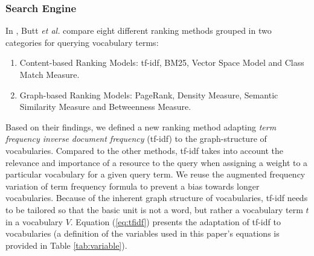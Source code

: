 \documentclass{iosart2c}
\begin{document}
	

\subsubsection{Search Engine}\label{sssec:search}
In \cite{butt2014}, Butt \emph{et al.} compare eight different ranking methods grouped in two categories for querying vocabulary terms:
\begin{enumerate}
	\item Content-based Ranking Models: tf-idf, BM25, Vector Space Model and Class Match Measure.
	\item Graph-based Ranking Models: PageRank, Density Measure, Semantic Similarity Measure and Betweenness Measure.
\end{enumerate}
Based on their findings, we defined a new ranking method adapting \emph{term frequency inverse document frequency} (tf-idf) to the graph-structure of vocabularies. Compared to the other methods, tf-idf takes into account the relevance and importance of a resource to the query when assigning a weight to a particular vocabulary for a given query term. We reuse the augmented frequency variation of term frequency formula to prevent a bias towards longer vocabularies. Because of the inherent graph structure of vocabularies, tf-idf needs to be tailored so that the basic unit is not a word, but rather a vocabulary term $t$ in a vocabulary $V$. Equation (\ref{eq:tfidf}) presents the adaptation of tf-idf to vocabularies (a definition of the variables used in this paper's equations is provided in Table \ref{tab:variable}). 
\end{document}

